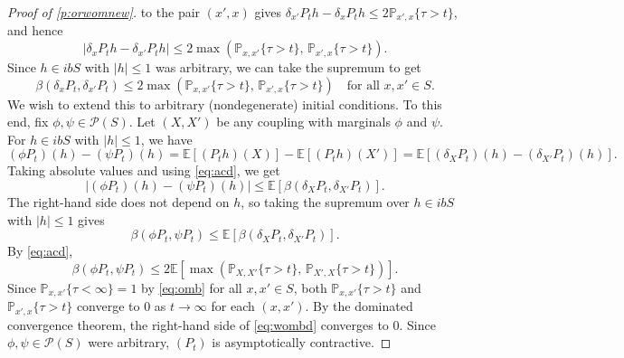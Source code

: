 \documentclass[10pt,a4paper]{amsart}
\newcommand{\EE}{\mathbb E}
\newcommand{\PP}{\mathbb P}
\newcommand{\pP}{\mathscr{P}}
\begin{document}
\begin{proof}[Proof of \cref{p:orwomnew}]
    to the pair $(x', x)$ gives $\delta_{x'} P_t h - \delta_x P_t h
    \leq 2 \PP_{x',x} \{\tau > t\}$, and hence
    \begin{equation*}
        |\delta_x P_t h - \delta_{x'} P_t h| \leq 2 \max(\PP_{x,x'} \{\tau > t\},\, \PP_{x',x} \{\tau > t\}).
    \end{equation*}
    Since $h \in ibS$ with $|h| \leq 1$ was arbitrary, we can take the supremum to get
    \begin{equation}\label{eq:acd}
        \beta(\delta_x P_t , \delta_{x'} P_t) \leq 2 \max(\PP_{x,x'} \{\tau > t\},\, \PP_{x',x} \{\tau > t\})
        \quad \text{for all } x,x' \in S.
    \end{equation}
    We wish to extend this to arbitrary (nondegenerate) initial conditions.
    To this end, fix $\phi, \psi \in \pP(S)$. Let $(X, X')$ be any coupling with marginals
    $\phi$ and $\psi$. For $h \in ibS$ with $|h| \leq 1$, we have
    \begin{equation*}
        (\phi P_t)(h) - (\psi P_t)(h)
        = \EE[(P_t h)(X)] - \EE[(P_t h)(X')]
        = \EE[(\delta_X P_t)(h) - (\delta_{X'} P_t)(h)].
    \end{equation*}
    Taking absolute values and using \eqref{eq:acd}, we get
    \begin{equation*}
        |(\phi P_t)(h) - (\psi P_t)(h)| \leq \EE[\beta(\delta_X P_t, \delta_{X'} P_t)].
    \end{equation*}
    The right-hand side does not depend on $h$, so taking the supremum over $h \in ibS$ with $|h| \leq 1$ gives
    \begin{equation*}
        \beta(\phi P_t, \psi P_t) \leq \EE[\beta(\delta_X P_t, \delta_{X'} P_t)].
    \end{equation*}
    By \eqref{eq:acd},
    \begin{equation}\label{eq:wombd}
        \beta(\phi P_t, \psi P_t) \leq 2\EE[\max(\PP_{X,X'}\{\tau > t\},\, \PP_{X',X}\{\tau > t\})].
    \end{equation}
    Since $\PP_{x,x'}\{\tau < \infty\} = 1$ by \eqref{eq:omb} for all $x, x' \in S$,
    both $\PP_{x,x'}\{\tau > t\}$ and $\PP_{x',x}\{\tau > t\}$ converge to $0$
    as $t \to \infty$ for each $(x,x')$.
    By the dominated convergence theorem, the right-hand side of
    \eqref{eq:wombd} converges to $0$.
    Since $\phi, \psi \in \pP(S)$ were arbitrary, $(P_t)$ is asymptotically
    contractive.
\end{proof}
\end{document}
